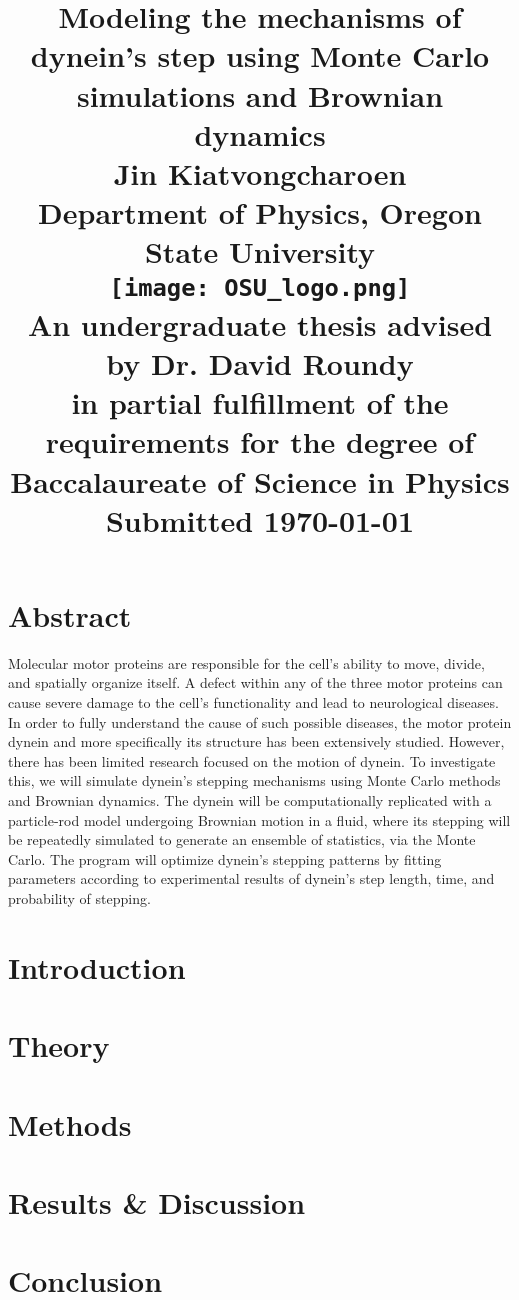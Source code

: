 \documentclass[12pt]{report}
\title{
	\Huge{Modeling the mechanisms of dynein's step using Monte Carlo simulations and Brownian dynamics}\vspace{1em}\\
	\Large{Jin Kiatvongcharoen} \vspace{0.5em}\\ 
	\normalsize{Department of Physics, Oregon State University}\vspace{2em}\\
	\texttt{[image: OSU\_logo.png]}\vspace{1em}\\
	\normalsize{An undergraduate thesis advised by Dr. David Roundy}\\
	\normalsize{in partial fulfillment of the requirements for the degree of}\\
	\normalsize{Baccalaureate of Science in Physics}\vspace{1.5 em}\\
	\normalsize{Submitted \today}\\


}
\date{}
\begin{document}
    \maketitle
    \onehalfspacing


	\chapter*{Abstract}
	Molecular motor proteins are responsible for the cell’s ability to move, divide, and spatially organize itself. A defect within any of the three motor proteins can cause severe damage to the cell’s functionality and lead to neurological diseases. In order to fully understand the cause of such possible diseases, the motor protein dynein and more specifically its structure has been extensively studied. However, there has been limited research focused on the motion of dynein. To investigate this, we will simulate dynein’s stepping mechanisms using Monte Carlo methods and Brownian dynamics. The dynein will be computationally replicated with a particle-rod model undergoing Brownian motion in a fluid, where its stepping will be repeatedly simulated to generate an ensemble of statistics, via the Monte Carlo. The program will optimize dynein’s stepping patterns by fitting parameters according to experimental results of dynein’s step length, time, and probability of stepping. 
	
    \begin{spacing}{1.2}
	\tableofcontents
	\listoffigures
	\end{spacing}
	
	
	\chapter{Introduction}
	
	\chapter{Theory}
	
	\chapter{Methods}
	
	\chapter{Results \& Discussion}
	
	\chapter{Conclusion}
	


\newpage
\cite{Burgess2003} \cite{Cianfrocco2015mechanism} \cite{Dewitt2012} \cite{Capek2017}


\end{document}
